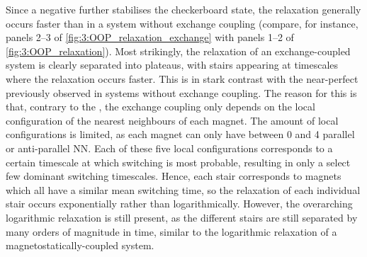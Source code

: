 \vspace{-1em}

Since a negative  further stabilises the checkerboard state, the relaxation generally occurs faster than in a system without exchange coupling (compare, for instance, panels 2--3 of \cref{fig:3:OOP_relaxation_exchange} with panels 1--2 of \cref{fig:3:OOP_relaxation}).
Most strikingly, the relaxation of an exchange-coupled system is clearly separated into plateaus, with stairs appearing at timescales where the relaxation occurs faster.
This is in stark contrast with the near-perfect  previously observed in systems without exchange coupling.
The reason for this is that, contrary to the , the exchange coupling only depends on the local configuration of the nearest neighbours of each magnet.
The amount of local configurations is limited, as each magnet can only have between 0 and 4 parallel or anti-parallel NN.
Each of these five local configurations corresponds to a certain timescale at which switching is most probable, resulting in only a select few dominant switching timescales.
Hence, each stair corresponds to magnets which all have a similar mean switching time, so the relaxation of each individual stair occurs exponentially rather than logarithmically.
However, the overarching logarithmic relaxation is still present, as the different stairs are still separated by many orders of magnitude in time, similar to the logarithmic relaxation of a magnetostatically-coupled system. \\\par

